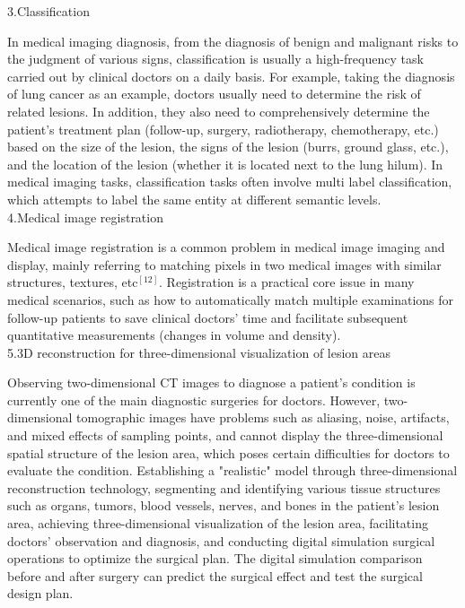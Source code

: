 \documentclass[12pt,a4paper]{report}
\begin{document}
3.Classification

\qquad In medical imaging diagnosis, from the diagnosis of benign and malignant risks to the judgment of various signs, classification is usually a high-frequency task carried out by clinical doctors on a daily basis.
For example, taking the diagnosis of lung cancer as an example, doctors usually need to determine the risk of related lesions. In addition, they also need to comprehensively determine the patient's treatment plan
(follow-up, surgery, radiotherapy, chemotherapy, etc.) based on the size of the lesion, the signs of the lesion (burrs, ground glass, etc.), and the location of the lesion (whether it is located next to the lung hilum).
In medical imaging tasks, classification tasks often involve multi label classification, which attempts to label the same entity at different semantic levels.\\

4.Medical image registration

\qquad Medical image registration is a common problem in medical image imaging and display, mainly referring to matching pixels in two medical images with similar structures, textures, etc$^{[12]}$.
Registration is a practical core issue in many medical scenarios, such as how to automatically match multiple examinations for follow-up patients to save clinical doctors' time and facilitate subsequent quantitative measurements
(changes in volume and density).\\

5.3D reconstruction for three-dimensional visualization of lesion areas

\qquad Observing two-dimensional CT images to diagnose a patient's condition is currently one of the main diagnostic surgeries for doctors. However, two-dimensional tomographic images have problems such as aliasing, noise, artifacts,
and mixed effects of sampling points, and cannot display the three-dimensional spatial structure of the lesion area, which poses certain difficulties for doctors to evaluate the condition. Establishing a "realistic" model through
three-dimensional reconstruction technology, segmenting and identifying various tissue structures such as organs, tumors, blood vessels, nerves, and bones in the patient's lesion area, achieving three-dimensional visualization of
the lesion area, facilitating doctors' observation and diagnosis, and conducting digital simulation surgical operations to optimize the surgical plan. The digital simulation comparison before and after surgery can predict the surgical
effect and test the surgical design plan.\\
\end{document}
